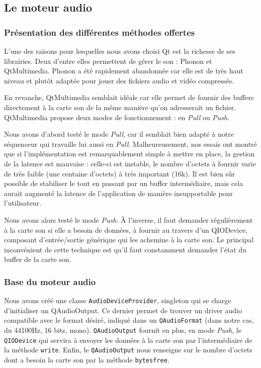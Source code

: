 \subsection{Le moteur audio}

\subsubsection{Présentation des différentes méthodes offertes}

L'une des raisons pour lesquelles nous avons choisi Qt est la
richesse de ses librairies. Deux d'entre elles permettent de gérer le son
: Phonon et QtMultimedia. Phonon a été rapidement abandonnée car
elle est de très haut niveau et plutôt adaptée pour jouer des
fichiers audio et vidéo compressés.

En revanche, QtMultimedia semblait idéale car elle permet de
fournir des buffers directement à la carte son de la même manière
qu'on adresserait un fichier. QtMultimedia propose deux modes de
fonctionnement : en \emph{Pull} ou \emph{Push}.

Nous avons d'abord testé le mode \emph{Pull}, car il semblait bien
adapté à notre séquenceur qui travaille lui aussi en \emph{Pull}.
Malheureusement, nos essais ont montré que si l'implémentation est
remarquablement simple à mettre en place, la gestion de la latence
est mauvaise : celle-ci est instable, le nombre d'octets à fournir
varie de très faible (une centaine d'octets) à très important
(16k). Il est bien sûr possible de stabiliser le tout en passant
par un buffer intermédiaire, mais cela aurait augmenté la latence de
l'application de manière insupportable pour l'utilisateur.

Nous avons alors testé le mode \emph{Push}. À l'inverse, il faut
demander régulièrement à la carte son si elle a besoin de données,
à fournir au travers d'un QIODevice, composant d'entrée/sortie
générique qui les achemine à la carte son. Le principal
inconvénient de cette technique est qu'il faut constamment demander
l'état du buffer de la carte son.

\subsubsection{Base du moteur audio}

Nous avons créé une classe \verb!AudioDeviceProvider!, singleton
qui se charge d'initialiser un QAudioOutput. Ce dernier permet
de trouver un driver audio compatible avec le format désiré,
indiqué dans un \verb!QAudioFormat! (dans notre cas, du 44100Hz, 16
bits, mono). \verb!QAudioOutput! fournit en plus, en mode
\emph{Push}, le \verb!QIODevice! qui servira à envoyer les données
à la carte son par l'intermédiaire de la méthode \verb!write!.
Enfin, le \verb!QAudioOutput! nous renseigne sur le nombre d'octets
dont a besoin la carte son par la méthode \verb!bytesfree!.

